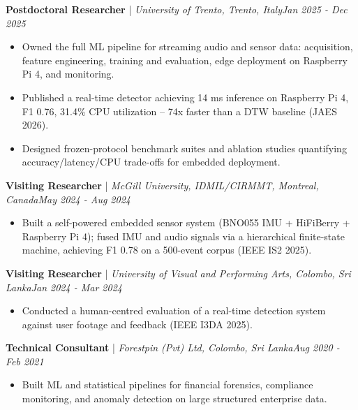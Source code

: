 \documentclass[11pt]{article}
\newenvironment{cvrole}[5]{%
  \par\noindent\textbf{\large #1} | \textit{\small #2, #3}\hfill \textit{\small #4 - #5}\par
  \begin{itemize}[leftmargin=2em, itemsep=-0.3em, topsep=-0.5em]%
}{%
  \end{itemize}\par\noindent\mbox{}\par\vspace{0.1em}%
}
\begin{document}
\begin{cvrole}{Postdoctoral Researcher}{University of Trento}{Trento, Italy}{Jan 2025}{Dec 2025}
\item Owned the full ML pipeline for streaming audio and sensor data: acquisition, feature engineering, training and evaluation, edge deployment on Raspberry Pi 4, and monitoring.
\item Published a real-time detector achieving 14 ms inference on Raspberry Pi 4, F1 0.76, 31.4\% CPU utilization -- 74x faster than a DTW baseline (JAES 2026).
\item Designed frozen-protocol benchmark suites and ablation studies quantifying accuracy/latency/CPU trade-offs for embedded deployment.
\end{cvrole}

\begin{cvrole}{Visiting Researcher}{McGill University, IDMIL/CIRMMT}{Montreal, Canada}{May 2024}{Aug 2024}
\item Built a self-powered embedded sensor system (BNO055 IMU + HiFiBerry + Raspberry Pi 4); fused IMU and audio signals via a hierarchical finite-state machine, achieving F1 0.78 on a 500-event corpus (IEEE IS2 2025).
\end{cvrole}

\begin{cvrole}{Visiting Researcher}{University of Visual and Performing Arts}{Colombo, Sri Lanka}{Jan 2024}{Mar 2024}
\item Conducted a human-centred evaluation of a real-time detection system against user footage and feedback (IEEE I3DA 2025).
\end{cvrole}

\begin{cvrole}{Technical Consultant}{Forestpin (Pvt) Ltd}{Colombo, Sri Lanka}{Aug 2020}{Feb 2021}
\item Built ML and statistical pipelines for financial forensics, compliance monitoring, and anomaly detection on large structured enterprise data.
\end{cvrole}
\end{document}
